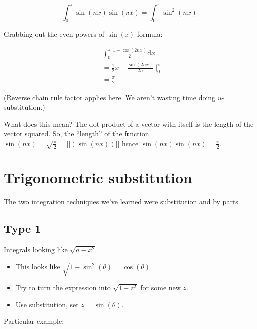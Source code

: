 \documentclass[12pt]{article}
\theoremstyle{plain}
\theoremstyle{remark}
\theoremstyle{definition}
\begin{document}
\[\int_{0}^{\pi}{\sin\left( nx \right)\sin\left( nx \right)} = \int_{0}^{\pi}{\sin^{2}\left( nx \right)}\]

Grabbing out the even powers of \(\sin(x)\) formula:

\begin{align*}
&\int_{0}^{\pi}{\frac{1 - \cos(2nx)}{2}\text{d}x} \\
&= \frac{1}{2}x - \frac{\sin(2nx)}{2n} \mid_{0}^{\pi} \\
&= \frac{\pi}{2}
\end{align*}


(Reverse chain rule factor applies here. We aren't wasting time doing
\(u\)-substitution.)

What does this mean? The dot product of a vector with itself is the
length of the vector squared. So, the ``length'' of the function
\(\sin\left( nx \right) = \sqrt{\frac{\pi}{2}} = \left| \left| \left( \sin\left( nx \right) \right) \right| \right|\)
hence
\(\sin\left( nx \right)\sin\left( nx \right) = \frac{\pi}{2}\).


\section{Trigonometric substitution}

The two integration techniques we've learned were substitution and by
parts.


\subsection{Type 1}

Integrals looking like \(\sqrt{a - x^{2}}\)

\begin{itemize}
\item
  This looks like \(\sqrt{1 - \sin^{2}(\theta)} = \cos(\theta)\)
\item
  Try to turn the expression into \(\sqrt{1 - z^{2}}\) for some new
  \(z\).
\item
  Use substitution, set \(z = \sin(\theta)\).
\end{itemize}

Particular example:
\end{document}
